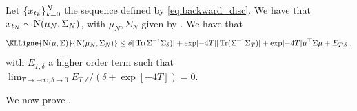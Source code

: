 \begin{proposition}
    \label{sec:conv-results-discr-2}
    Let $\{\bar{x}_{t_k}\}_{k=0}^N$ the sequence defined by
    \eqref{eq:backward_disc}. We have that
    $\bar{x}_{t_N} \sim \mathrm{N}(\mu_N, \Sigma_N)$, with $\mu_N, \Sigma_N$ given
    by .
    We have that
    \begin{align}
      \KLLigne{\mathrm{N}(\mu, \Sigma)}{\mathrm{N}(\mu_N, \Sigma_N)} \leq \delta \absLigne{\trace(\Sigma^{-1}\Sigma_\delta)} + \exp[-4T] \absLigne{\trace(\Sigma^{-1}\Sigma_T)} + \exp[-4T]\mu^\top\Sigma \mu + E_{T, \delta} \eqsp ,
    \end{align}
    with $E_{T, \delta}$ a higher order term such that $\lim_{T \to +\infty, \delta \to 0} E_{T, \delta} /(\delta + \exp[-4T]) = 0$.
\end{proposition}

We now prove .


